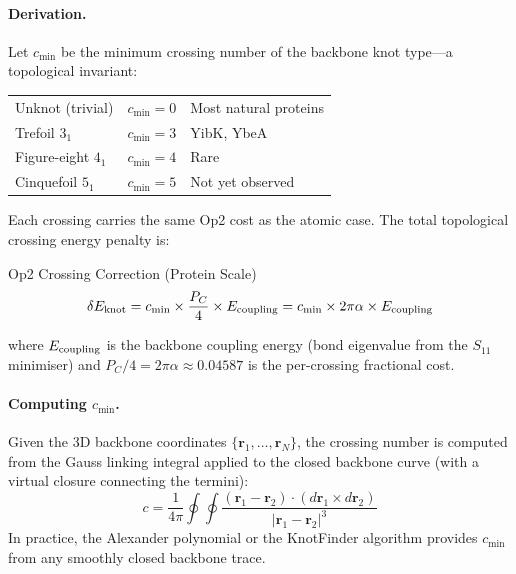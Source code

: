 \paragraph{Derivation.}
Let $c_{\min}$ be the minimum crossing number of the
backbone knot type---a topological invariant:
\begin{center}
\renewcommand{\arraystretch}{1.2}
\begin{tabular}{l c l}
Unknot (trivial) & $c_{\min} = 0$ & Most natural proteins \\
Trefoil $3_1$    & $c_{\min} = 3$ & YibK, YbeA \\
Figure-eight $4_1$ & $c_{\min} = 4$ & Rare \\
Cinquefoil $5_1$ & $c_{\min} = 5$ & Not yet observed \\
\end{tabular}
\end{center}
Each crossing carries the same Op2 cost as the atomic
case.  The total topological crossing energy penalty is:
\begin{resultbox}{Op2 Crossing Correction (Protein Scale)}
\begin{equation}
    \delta E_{\rm knot}
    = c_{\min} \times \frac{P_C}{4} \times E_{\rm coupling}
    = c_{\min} \times 2\pi\alpha \times E_{\rm coupling}
    \label{eq:op2_protein}
\end{equation}
\end{resultbox}
\noindent where $E_{\rm coupling}$ is the backbone coupling
energy (bond eigenvalue from the $S_{11}$ minimiser) and
$P_C/4 = 2\pi\alpha \approx 0.04587$ is the per-crossing
fractional cost.

\paragraph{Computing $c_{\min}$.}
Given the 3D backbone coordinates
$\{\mathbf{r}_1, \ldots, \mathbf{r}_N\}$, the crossing
number is computed from the Gauss linking integral applied
to the closed backbone curve (with a virtual closure
connecting the termini):
\begin{equation}
    c = \frac{1}{4\pi}
    \oint \oint
    \frac{(\mathbf{r}_1 - \mathbf{r}_2) \cdot
          (d\mathbf{r}_1 \times d\mathbf{r}_2)}
         {|\mathbf{r}_1 - \mathbf{r}_2|^3}
    \label{eq:gauss_linking}
\end{equation}
In practice, the Alexander polynomial or the KnotFinder
algorithm provides $c_{\min}$ from any smoothly closed
backbone trace.

